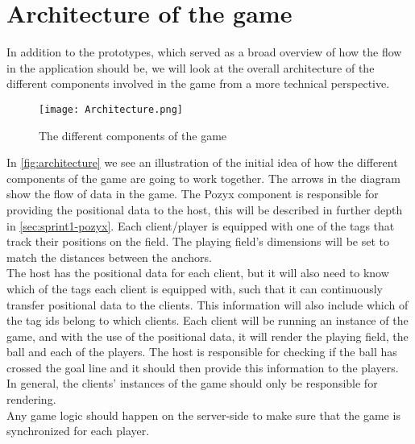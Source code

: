 \section{Architecture of the game}\label{sec:sprint1-architecture}
In addition to the prototypes, which served as a broad overview of how the flow in the application should be, we will look at the overall architecture of the different components involved in the game from a more technical perspective.
\begin{figure}[H]
    \centering
    \texttt{[image: Architecture.png]}
    \caption{The different components of the game}
    \label{fig:architecture}
\end{figure}
\noindent
In \autoref{fig:architecture} we see an illustration of the initial idea of how the different components of the game are going to work together.
The arrows in the diagram show the flow of data in the game.
The Pozyx component is responsible for providing the positional data to the host, this will be described in further depth in \autoref{sec:sprint1-pozyx}.
Each client/player is equipped with one of the tags that track their positions on the field. 
The playing field's dimensions will be set to match the distances between the anchors. \\
The host has the positional data for each client, but it will also need to know which of the tags each client is equipped with, such that it can continuously transfer positional data to the clients.
This information will also include which of the tag ids belong to which clients.
Each client will be running an instance of the game, and with the use of the positional data, it will render the playing field, the ball and each of the players.
The host is responsible for checking if the ball has crossed the goal line and it should then provide this information to the players.
In general, the clients' instances of the game should only be responsible for rendering. \\
Any game logic should happen on the server-side to make sure that the game is synchronized for each player. 
